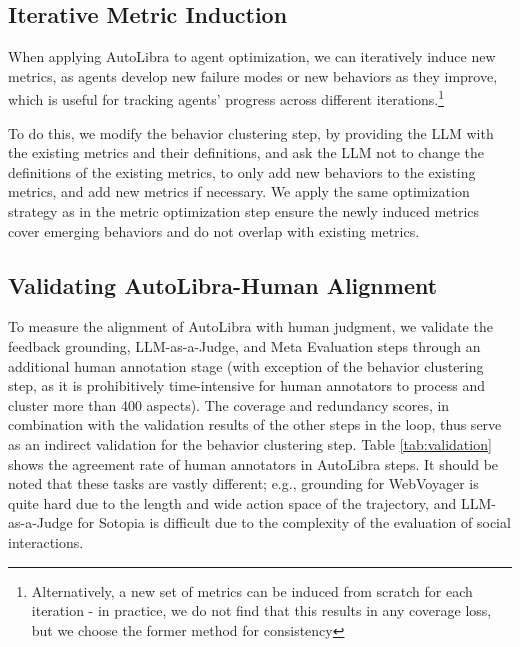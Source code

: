 \subsection{Iterative Metric Induction}
\label{sec:iterative-induction}
When applying AutoLibra to agent optimization, we can iteratively induce new metrics, as agents develop new failure modes or new behaviors as they improve, which is useful for tracking agents' progress across different iterations.\footnote{Alternatively, a new set of metrics can be induced from scratch for each iteration -  in practice, we do not find that this results in any coverage loss, but we choose the former method for consistency} 


To do this, we modify the behavior clustering step, by providing the LLM with the existing metrics
and their definitions, and ask the LLM not to change the definitions of the existing metrics, 
to only add new behaviors to the existing metrics, and add new metrics if necessary.
We apply the same optimization strategy as in the metric optimization step
ensure the newly induced metrics cover emerging behaviors and do not overlap with existing metrics.

\subsection{Validating AutoLibra-Human Alignment}

To measure the alignment of AutoLibra with human judgment,
we validate the feedback grounding, LLM-as-a-Judge, and Meta Evaluation steps through an additional human annotation stage (with exception of the behavior clustering step, as it is prohibitively time-intensive for human annotators to
process and cluster more than 400 aspects). The coverage and redundancy scores, in combination with the validation results of the other steps in the loop, thus serve as an indirect validation for the behavior clustering step.
Table \ref{tab:validation} shows the agreement rate of human annotators in AutoLibra steps. 
It should be noted that these tasks are vastly different; e.g., grounding for WebVoyager \citep{he2024webvoyager} is quite hard
due to the length and wide action space of the trajectory, and LLM-as-a-Judge for Sotopia \citep{zhousotopia} is
difficult due to the complexity of the evaluation of social interactions. 

